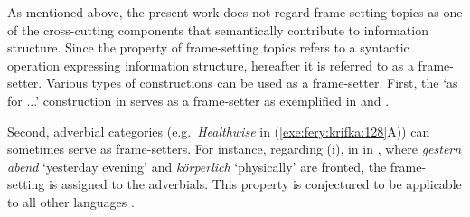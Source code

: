









As mentioned above, the present work does not regard frame-setting
topics as one of the cross-cutting components that semantically
contribute to information structure.  Since the property of
frame-setting topics refers to a syntactic operation expressing
information structure, hereafter it is referred to as a frame-setter.
Various types of constructions can be used as a frame-setter.  First,
the `as for ...'  construction in  serves as a frame-setter as
exemplified in  and
.




\noindent Second, adverbial categories (e.g.\ \textit{Healthwise} in
(\ref{exe:fery:krifka:128}A)) can sometimes serve as frame-setters.
For instance, regarding (i), in  in
, where \textit{gestern abend} `yesterday evening' and
\textit{k\"orperlich} `physically' are fronted, the frame-setting
 is assigned to the adverbials.  This property is conjectured to
be applicable to all other languages \citep{chafe:76,lambrecht:96}.





